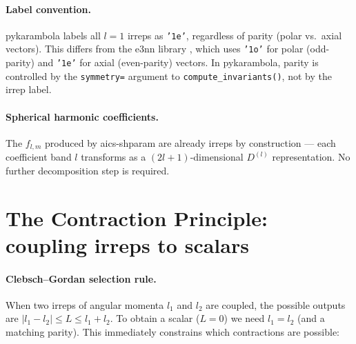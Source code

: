 \documentclass[11pt,a4paper]{article}
\begin{document}
\paragraph{Label convention.}
pykarambola labels all $l=1$ irreps as \texttt{'1e'}, regardless of parity
(polar vs.\ axial vectors).
This differs from the e3nn library \cite{Geiger2022e3nn}, which uses
\texttt{'1o'} for polar (odd-parity) and \texttt{'1e'} for axial (even-parity)
vectors.
In pykarambola, parity is controlled by the \texttt{symmetry=} argument to
\texttt{compute\_invariants()}, not by the irrep label.

\paragraph{Spherical harmonic coefficients.}
The $f_{l,m}$ produced by aics-shparam are already irreps by construction —
each coefficient band $l$ transforms as a $(2l+1)$-dimensional $D^{(l)}$
representation.
No further decomposition step is required.

\section{The Contraction Principle: coupling irreps to scalars}
\label{sec:contraction}

\paragraph{Clebsch--Gordan selection rule.}
When two irreps of angular momenta $l_1$ and $l_2$ are coupled, the possible
outputs are $|l_1 - l_2| \le L \le l_1 + l_2$.
To obtain a scalar ($L=0$) we need $l_1 = l_2$ (and a matching parity).
This immediately constrains which contractions are possible:
\end{document}
